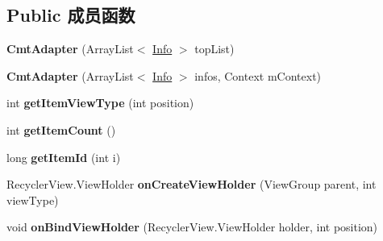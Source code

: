 \subsection*{Public 成员函数}
\begin{DoxyCompactItemize}
\item 
\mbox{\label{classcom_1_1example_1_1twitter_1_1_cmt_adapter_a9356d0cf121d0a1fca4d17efebf6de49}} 
{\bfseries Cmt\+Adapter} (Array\+List$<$ \mbox{\hyperlink{classcom_1_1example_1_1twitter_1_1_info}{Info}} $>$ top\+List)
\item 
\mbox{\label{classcom_1_1example_1_1twitter_1_1_cmt_adapter_ac095c589e92c4f204a39a57d4ceba37d}} 
{\bfseries Cmt\+Adapter} (Array\+List$<$ \mbox{\hyperlink{classcom_1_1example_1_1twitter_1_1_info}{Info}} $>$ infos, Context m\+Context)
\item 
\mbox{\label{classcom_1_1example_1_1twitter_1_1_cmt_adapter_a465a525035b5279c5aac3bf4f3036f51}} 
int {\bfseries get\+Item\+View\+Type} (int position)
\item 
\mbox{\label{classcom_1_1example_1_1twitter_1_1_cmt_adapter_ac179304e7ca91f5c02ef622da9424de2}} 
int {\bfseries get\+Item\+Count} ()
\item 
\mbox{\label{classcom_1_1example_1_1twitter_1_1_cmt_adapter_aa0751b0b75c42e78c740d1668359e296}} 
long {\bfseries get\+Item\+Id} (int i)
\item 
\mbox{\label{classcom_1_1example_1_1twitter_1_1_cmt_adapter_a146263cf4abeb7e3110a124b6df09489}} 
Recycler\+View.\+View\+Holder {\bfseries on\+Create\+View\+Holder} (View\+Group parent, int view\+Type)
\item 
\mbox{\label{classcom_1_1example_1_1twitter_1_1_cmt_adapter_ae868e66528ae413e688c9c835e472d60}} 
void {\bfseries on\+Bind\+View\+Holder} (Recycler\+View.\+View\+Holder holder, int position)
\end{DoxyCompactItemize}
